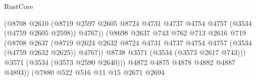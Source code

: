 \begin{lexlean}{RustCore}
\begin{coremodule}
                                            (@8708
                                              @2610
                                              (@8719
                                                @2597
                                                @2605
                                                @8724
                                                @4731
                                                @4737
                                                @4754
                                                @4757
                                                (@3534 (@4759 @2605 @2598))
                                                @4767))
                                            (@8698
                                              @2637
                                              @743
                                              @762
                                              @713
                                              @2616
                                              @719
                                              (@8708
                                                @2637
                                                (@8719
                                                  @2624
                                                  @2632
                                                  @8724
                                                  @4731
                                                  @4737
                                                  @4754
                                                  @4757
                                                  (@3534 (@4759 @2632 @2625))
                                                  @4767))
                                              @8738
                                              @3571
                                              (@3534 (@3573 @2617 @743)))
                                            @3571
                                            (@3534 (@3573 @2590 @2640)))
                                          @4872
                                          @4875
                                          @4878
                                          @4882
                                          @4887
                                          @4893))
                                      (@7880
                                        @522
                                        @516
                                        @11
                                        @15
                                        @2671
                                        @2694

\end{coremodule}
\end{lexlean}
